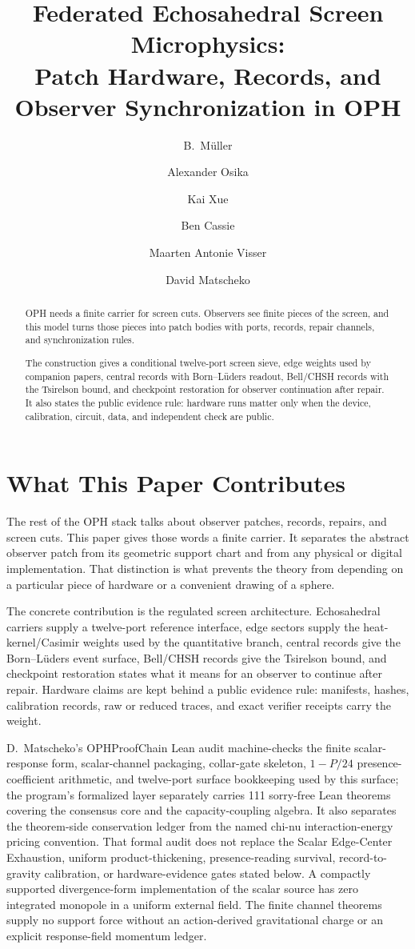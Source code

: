 \documentclass[11pt]{article}
\title{Federated Echosahedral Screen Microphysics:\\
Patch Hardware, Records, and Observer Synchronization in OPH}
\author{B.\ M\"uller \and Alexander Osika \and Kai Xue \and Ben Cassie \and Maarten Antonie Visser \and David Matscheko}
\date{\OPHPaperReleaseDate}
\theoremstyle{remark}
\theoremstyle{plain}
\begin{document}
\maketitle
\OPHPaperReleaseBanner

\begin{abstract}
OPH needs a finite carrier for screen cuts. Observers see finite pieces of the screen, and this model turns those pieces into patch bodies with ports, records, repair channels, and synchronization rules.

The construction gives a conditional twelve-port screen sieve, edge weights used by companion
papers, central records with Born--L\"uders readout, Bell/CHSH records with the
Tsirelson bound, and checkpoint restoration for observer continuation after
repair. It also states the public evidence rule: hardware runs matter only when
the device, calibration, circuit, data, and independent check are public.
\end{abstract}

\section*{What This Paper Contributes}

The rest of the OPH stack talks about observer patches, records, repairs, and screen cuts. This
paper gives those words a finite carrier. It separates the abstract observer patch from its
geometric support chart and from any physical or digital implementation. That distinction is what
prevents the theory from depending on a particular piece of hardware or a convenient drawing of a
sphere.

The concrete contribution is the regulated screen architecture. Echosahedral carriers supply a
twelve-port reference interface, edge sectors supply the heat-kernel/Casimir weights used by the
quantitative branch, central records give the Born--L\"uders event surface, Bell/CHSH records give
the Tsirelson bound, and checkpoint restoration states what it means for an observer to continue
after repair. Hardware claims are kept behind a public evidence rule: manifests, hashes,
calibration records, raw or reduced traces, and exact verifier receipts carry the weight.

D.\ Matscheko's OPHProofChain Lean audit machine-checks the finite
scalar-response form, scalar-channel packaging, collar-gate skeleton,
\(1-P/24\) presence-coefficient arithmetic, and twelve-port surface bookkeeping used by this
surface; the program's formalized layer separately carries 111 sorry-free
Lean theorems covering the consensus core and the capacity-coupling algebra.  It also separates the theorem-side conservation ledger from the
named chi-nu interaction-energy pricing convention.  That formal audit does not
replace the Scalar Edge-Center Exhaustion, uniform product-thickening,
presence-reading survival, record-to-gravity calibration, or hardware-evidence
gates stated below.
A compactly supported divergence-form implementation of the scalar source has
zero integrated monopole in a uniform external field.  The finite channel
theorems supply no support force without an action-derived gravitational charge
or an explicit response-field momentum ledger.
\end{document}
